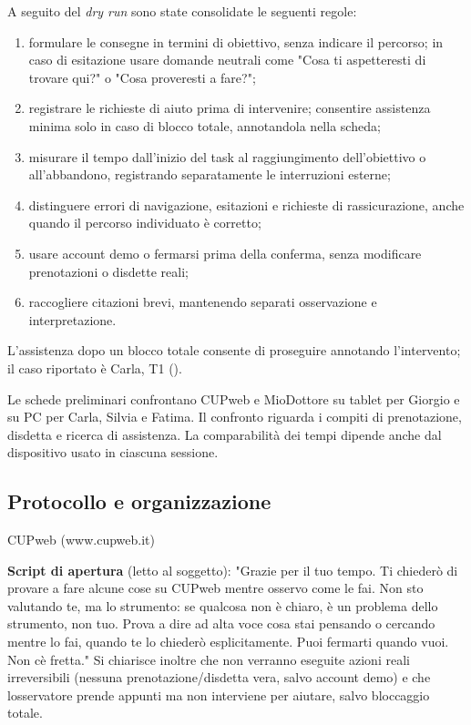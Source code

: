 A seguito del \emph{dry run} sono state consolidate le seguenti regole:
\begin{enumerate}
\item formulare le consegne in termini di obiettivo, senza indicare il
  percorso; in caso di esitazione usare domande neutrali come
  "Cosa ti aspetteresti di trovare qui?" o "Cosa proveresti a fare?";
\item registrare le richieste di aiuto prima di intervenire; consentire
  assistenza minima solo in caso di blocco totale, annotandola nella scheda;
\item misurare il tempo dall'inizio del task al raggiungimento dell'obiettivo
  o all'abbandono, registrando separatamente le interruzioni esterne;
\item distinguere errori di navigazione, esitazioni e richieste di
  rassicurazione, anche quando il percorso individuato è corretto;
\item usare account demo o fermarsi prima della conferma, senza modificare
  prenotazioni o disdette reali;
\item raccogliere citazioni brevi, mantenendo separati osservazione e
  interpretazione.
\end{enumerate}

L'assistenza dopo un blocco totale consente di proseguire annotando
l'intervento; il caso riportato è Carla, T1 ().

\label{doc:a:06a}

Le schede preliminari confrontano CUPweb e MioDottore su tablet per
Giorgio e su PC per Carla, Silvia e Fatima. Il confronto riguarda i compiti
di prenotazione, disdetta e ricerca di assistenza. La comparabilità dei tempi
dipende anche dal dispositivo usato in ciascuna sessione.

\subsection{Protocollo e organizzazione}


CUPweb (www.cupweb.it)


\textbf{Script di apertura} (letto al soggetto): "Grazie per il tuo
tempo. Ti chiederò di provare a fare alcune cose su CUPweb mentre osservo come le fai. Non sto valutando te, ma lo
strumento: se qualcosa non è chiaro, è un problema dello strumento,
non tuo. Prova a dire ad alta voce cosa stai pensando o cercando
mentre lo fai, quando te lo chiederò esplicitamente. Puoi fermarti
quando vuoi. Non c\textquotesingle è fretta." Si chiarisce inoltre che
non verranno eseguite azioni reali irreversibili (nessuna
prenotazione/disdetta vera, salvo account demo) e che
l\textquotesingle osservatore prende appunti ma non interviene per
aiutare, salvo bloccaggio totale.

